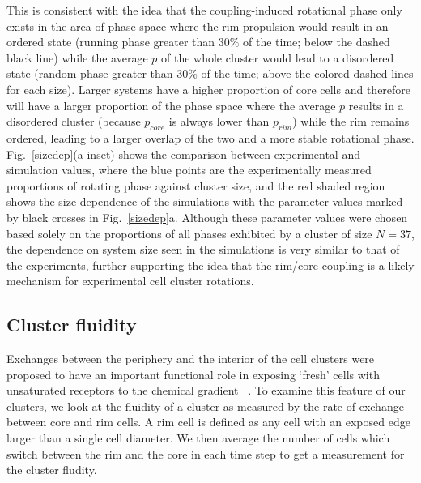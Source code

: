 \documentclass{article}
\begin{document}
 This is consistent with the idea that the coupling-induced rotational phase only exists in the area of phase space where the rim propulsion would result in an ordered state (running phase greater than $30\%$ of the time; below the dashed black line) while the average $p$ of the whole cluster would lead to a disordered state (random phase greater than $30\%$ of the time; above the colored dashed lines for each size). Larger systems have a higher proportion of core cells and therefore will have a larger proportion of the phase space where the average $p$ results in a disordered cluster (because $p_{core}$ is always lower than $p_{rim}$) while the rim remains ordered, leading to a larger overlap of the two and a more stable rotational phase. Fig.~\ref{sizedep}(a inset) shows the comparison between experimental and simulation values, where the blue points are the experimentally measured proportions of rotating phase against cluster size, and the red shaded region shows the size dependence of the simulations with the parameter values marked by black crosses in Fig.~\ref{sizedep}a. Although these parameter values were chosen based solely on the proportions of all phases exhibited by a cluster of size $N=37$, the dependence on system size seen in the simulations is very similar to that of the experiments, further supporting the idea that the rim/core coupling is a likely mechanism for experimental cell cluster rotations. 

\subsection*{Cluster fluidity}

Exchanges between the periphery and the interior of the cell clusters were proposed to have an important functional role in exposing `fresh' cells with unsaturated receptors to the chemical gradient ~\cite{Malet-Engra2014}. To examine this feature of our clusters, we look at the fluidity of a cluster as measured by the rate of exchange between core and rim cells.  A rim cell is defined as any cell with an exposed edge larger than a single cell diameter. We then average the number of cells which switch between the rim and the core in each time step to get a measurement for the cluster fludity.
\end{document}
